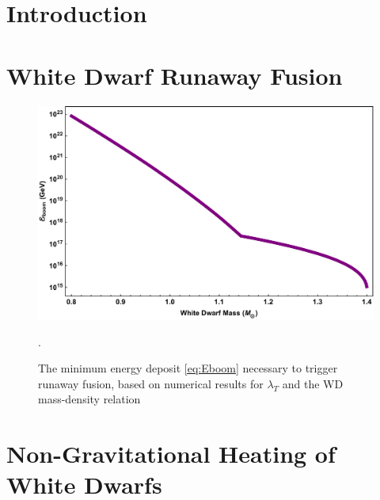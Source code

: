 \documentclass[twocolumn, preprintnumbers,amsmath,amssymb,prd, superscriptaddress]{revtex4}
\begin{document}
\section{Introduction}
\label{sec:intro}


\section{White Dwarf Runaway Fusion}
\label{sec:boomreview}


\begin{figure}
\includegraphics[scale=.3]{Eboom.pdf}
\caption{The minimum energy deposit \eqref{eq:Eboom} necessary to trigger runaway fusion, based on numerical results for $\lambda_T$ \cite{Woosley} and the WD mass-density relation \cite{cococubed}}.
\label{fig:Eboom}
\end{figure}

\section{Non-Gravitational Heating of White Dwarfs}
\label{sec:smheating}

\end{document}
